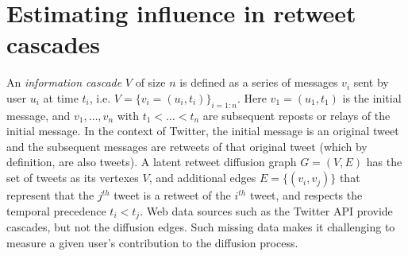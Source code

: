 
\section{Estimating influence in retweet cascades}
\label{sec:user-influence}



An {\em information cascade} $V$ of size $n$ is defined as a series of messages $v_i$ sent by user $u_i$ at time $t_i$, i.e. $V=\{v_i=(u_i, t_i)\}_{i=1:n}$.
Here $v_1 = (u_1, t_1)$ is the initial message, and $v_1, \ldots, v_n$ with $t_1<\ldots<t_n$ are subsequent reposts or relays of the initial message.
In the context of Twitter, the initial message is an original tweet and the subsequent messages are retweets of that original tweet (which by definition, are also tweets).
A latent retweet diffusion graph $G=(V,E)$ has the set of tweets as its vertexes $V$, and additional edges $E=\{(v_i, v_j)\}$ that represent that the $j^{th}$ tweet is a retweet of the $i^{th}$ tweet, and respects the temporal precedence $t_i<t_j$. 
Web data sources such as the Twitter API provide cascades, but not the
diffusion edges. 
Such missing data makes it challenging to measure a given user's contribution to the diffusion process.

